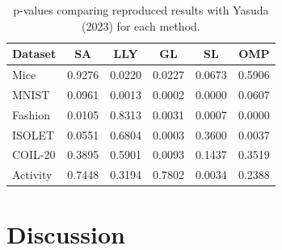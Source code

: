 \documentclass[a4paper,twocolumn]{article} %
\begin{document}
\begin{table}[ht]
\centering
\scriptsize
\begin{tabular}{lccccc}
\hline
\textbf{Dataset} & \textbf{SA} & \textbf{LLY} & \textbf{GL} & \textbf{SL} & \textbf{OMP} \\
\hline
Mice     & 0.9276 & 0.0220 & 0.0227 & 0.0673 & 0.5906 \\
MNIST    & 0.0961 & 0.0013 & 0.0002 & 0.0000 & 0.0607 \\
Fashion  & 0.0105 & 0.8313 & 0.0031 & 0.0007 & 0.0000 \\
ISOLET   & 0.0551 & 0.6804 & 0.0003 & 0.3600 & 0.0037 \\
COIL-20  & 0.3895 & 0.5901 & 0.0093 & 0.1437 & 0.3519 \\
Activity & 0.7448 & 0.3194 & 0.7802 & 0.0034 & 0.2388 \\
\hline
\end{tabular}
\caption{p-values comparing reproduced results with Yasuda (2023) for each method.}
\label{tab:methodwise-pval}
\end{table}

\begin{table}[ht]
\centering
{}
\caption{Comparison of accuracy using all features. p-values are from one-sample t-tests against Lemhadri (2021) and Yasuda (2023)'s reported means.}
\label{tab:all-feature-pval}
\end{table}

\section{Discussion}
\end{document}

